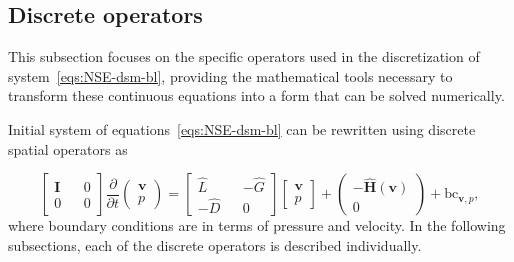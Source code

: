 \documentclass{article}
\begin{document}
\subsection{Discrete operators}

This subsection focuses on the specific operators used in the discretization of system~\eqref{eqs:NSE-dsm-bl}, providing the mathematical tools necessary to transform these continuous equations into a form that can be solved numerically.

Initial system of equations~\eqref{eqs:NSE-dsm-bl} can be rewritten using discrete spatial operators as

\begin{equation}\label{eqn:nse-matrix}
            \begin{bmatrix}
                  \mathbf{I} && 0 \\ 
                  0 && 0
            \end{bmatrix}
            \frac{\partial }{\partial t} 
            \begin{pmatrix}
                  \boldsymbol{v} \\ 
                  p
            \end{pmatrix}
            =
            \begin{bmatrix}
                  \hat{L} && - \hat{G} \\ 
                  -\hat{D} && 0
            \end{bmatrix}
            \begin{bmatrix}
                  \boldsymbol{v} \\
                  p
            \end{bmatrix}
            +
            \begin{pmatrix}
                  -\mathbf{\hat{H}}(\boldsymbol{v})\\
                  0
            \end{pmatrix} + \text{bc}_{\boldsymbol{v},p},
        \end{equation}
where boundary conditions are in terms of pressure and velocity. In the following subsections, each of the discrete operators is described individually. 

\end{document}
